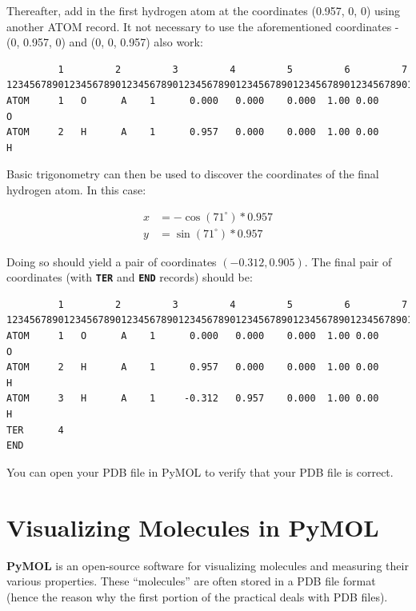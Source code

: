 \documentclass[
  letterpaper,
  DIV=11,
  numbers=noendperiod]{scrreprt}
\begin{document}
Thereafter, add in the first hydrogen atom at the coordinates (0.957, 0,
0) using another ATOM record. It not necessary to use the aforementioned
coordinates - (0, 0.957, 0) and (0, 0, 0.957) also work:

\begin{verbatim}
         1         2         3         4         5         6         7
1234567890123456789012345678901234567890123456789012345678901234567890123456789
ATOM     1   O      A    1      0.000   0.000    0.000  1.00 0.00            O
ATOM     2   H      A    1      0.957   0.000    0.000  1.00 0.00            H
\end{verbatim}

Basic trigonometry can then be used to discover the coordinates of the
final hydrogen atom. In this case:

\begin{align}
  x &= -\cos(71^\circ) * 0.957 \\ 
  y &= \sin(71^\circ) * 0.957
\end{align}

Doing so should yield a pair of coordinates \((-0.312, 0.905)\). The
final pair of coordinates (with \textbf{\texttt{TER}} and
\textbf{\texttt{END}} records) should be:

\begin{verbatim}
         1         2         3         4         5         6         7
1234567890123456789012345678901234567890123456789012345678901234567890123456789
ATOM     1   O      A    1      0.000   0.000    0.000  1.00 0.00            O
ATOM     2   H      A    1      0.957   0.000    0.000  1.00 0.00            H
ATOM     3   H      A    1     -0.312   0.957    0.000  1.00 0.00            H
TER      4
END 
\end{verbatim}

You can open your PDB file in PyMOL to verify that your PDB file is
correct.

\hypertarget{visualizing-molecules-in-pymol}{%
\section{Visualizing Molecules in
PyMOL}\label{visualizing-molecules-in-pymol}}

\textbf{PyMOL} is an open-source software for visualizing molecules and
measuring their various properties. These ``molecules'' are often stored
in a PDB file format (hence the reason why the first portion of the
practical deals with PDB files).
\end{document}
